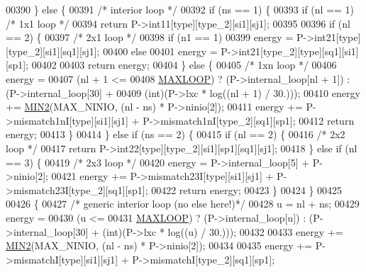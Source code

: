 \begin{DoxyCode}
00390   \} \textcolor{keywordflow}{else} \{
00391     \textcolor{comment}{/* interior loop */}
00392     \textcolor{keywordflow}{if} (ns == 1) \{
00393       \textcolor{keywordflow}{if} (nl == 1)                    \textcolor{comment}{/* 1x1 loop */}
00394         \textcolor{keywordflow}{return} P->int11[type][type\_2][si1][sj1];
00395 
00396       \textcolor{keywordflow}{if} (nl == 2) \{
00397         \textcolor{comment}{/* 2x1 loop */}
00398         \textcolor{keywordflow}{if} (n1 == 1)
00399           energy = P->int21[type][type\_2][si1][sq1][sj1];
00400         \textcolor{keywordflow}{else}
00401           energy = P->int21[type\_2][type][sq1][si1][sp1];
00402 
00403         \textcolor{keywordflow}{return} energy;
00404       \} \textcolor{keywordflow}{else} \{
00405         \textcolor{comment}{/* 1xn loop */}
00406         energy =
00407           (nl + 1 <=
00408            \hyperlink{energy__const_8h_ad1bd6eabac419670ddd3c9ed82145988}{MAXLOOP}) ? (P->internal\_loop[nl + 1]) : (P->internal\_loop[30] +
00409                                                     (int)(P->lxc * log((nl + 1) / 30.)));
00410         energy  += \hyperlink{group__utils_gae0b9cd0ce090bd69b951aa73e8fa4f7d}{MIN2}(MAX\_NINIO, (nl - ns) * P->ninio[2]);
00411         energy  += P->mismatch1nI[type][si1][sj1] + P->mismatch1nI[type\_2][sq1][sp1];
00412         \textcolor{keywordflow}{return} energy;
00413       \}
00414     \} \textcolor{keywordflow}{else} \textcolor{keywordflow}{if} (ns == 2) \{
00415       \textcolor{keywordflow}{if} (nl == 2) \{
00416         \textcolor{comment}{/* 2x2 loop */}
00417         \textcolor{keywordflow}{return} P->int22[type][type\_2][si1][sp1][sq1][sj1];
00418       \} \textcolor{keywordflow}{else} \textcolor{keywordflow}{if} (nl == 3) \{
00419         \textcolor{comment}{/* 2x3 loop */}
00420         energy  = P->internal\_loop[5] + P->ninio[2];
00421         energy  += P->mismatch23I[type][si1][sj1] + P->mismatch23I[type\_2][sq1][sp1];
00422         \textcolor{keywordflow}{return} energy;
00423       \}
00424     \}
00425 
00426     \{
00427       \textcolor{comment}{/* generic interior loop (no else here!)*/}
00428       u       = nl + ns;
00429       energy  =
00430         (u <=
00431          \hyperlink{energy__const_8h_ad1bd6eabac419670ddd3c9ed82145988}{MAXLOOP}) ? (P->internal\_loop[u]) : (P->internal\_loop[30] + (int)(P->lxc * log((u) / 30.)));
00432 
00433       energy += \hyperlink{group__utils_gae0b9cd0ce090bd69b951aa73e8fa4f7d}{MIN2}(MAX\_NINIO, (nl - ns) * P->ninio[2]);
00434 
00435       energy += P->mismatchI[type][si1][sj1] + P->mismatchI[type\_2][sq1][sp1];

\end{DoxyCode}
